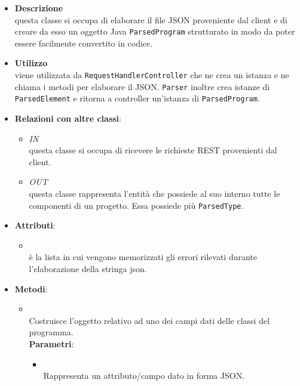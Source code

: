 \begin{itemize}
\item \textbf{Descrizione}\\
questa classe si occupa di elaborare il file JSON proveniente dal client e di creare da esso un oggetto Java \texttt{ParsedProgram} strutturato in modo da poter essere facilmente convertito in codice.
\item \textbf{Utilizzo}\\
viene utilizzata da \texttt{RequestHandlerController} che ne crea un istanza e ne chiama i metodi per elaborare il JSON. \texttt{Parser} inoltre crea istanze di \texttt{ParsedElement} e ritorna a controller un'istanza di \texttt{ParsedProgram}.
\item \textbf{Relazioni con altre classi}:
\begin{itemize}
\item \textit{IN} \hyperref[\nogloxy{swedesigner::server::controller::RequestHandlerController}]{}\\
questa classe si occupa di ricevere le richieste REST provenienti dal client.
\item \textit{OUT} \hyperref[\nogloxy{swedesigner::server::project::ParsedProgram}]{}\\
questa classe rappresenta l'entità che possiede al suo interno tutte le componenti di un progetto. Essa possiede più \texttt{ParsedType}.
\end{itemize}
\item \textbf{Attributi}:
\begin{itemize}
\item {}
\\ è la lista in cui vengono memorizzati gli errori rilevati durante l'elaborazione della stringa json.
\end{itemize}
\item \textbf{Metodi}:
\begin{itemize}
\item {}
\\ Costruisce l'oggetto relativo ad uno dei campi dati delle classi del programma.
\\ \textbf{Parametri}:
\begin{itemize}
\item {}
\\ Rappresenta un attributo/campo dato in forma JSON.

\end{itemize}
\end{itemize}
\end{itemize}
